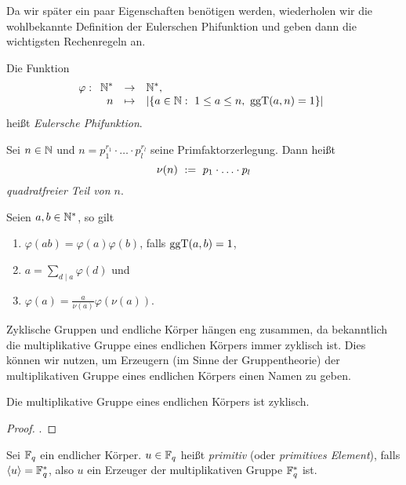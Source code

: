 Da wir später ein paar Eigenschaften benötigen
werden, wiederholen wir die wohlbekannte Definition der Eulerschen
Phifunktion und geben dann die wichtigsten Rechenregeln an.

\begin{definition}
  \label{def:euler_phi}
  Die Funktion
  \[ \varphi: \funcdef{\N^\ast &\to& \N^\ast,\\
    n &\mapsto& |\{ a \in \N:\ 1\leq a\leq n,\ \ggT(a,n)=1 \}|}\]
  heißt \emph{Eulersche Phifunktion}.
\end{definition}

\begin{definition}
  \label{def:quadratfreier_teil}
  Sei $n \in \mathbb{N}$ und $n = p_1^{r_1}\cdot\ldots\cdot p_l^{r_l}$ seine
  Primfaktorzerlegung. Dann heißt
  \[ \nu(n) \ :=\  p_1\cdot \ldots\cdot p_l\]
  \emph{quadratfreier Teil von $n$}.
\end{definition}


\begin{lemma}
  \label{lemma:rechenregeln_phifunktion}
  Seien $a,b\in\mathbb{N}^\ast$, so gilt
  \begin{enumerate}
    \item $\varphi(ab) = \varphi(a)\varphi(b)$, falls $\operatorname{ggT}(a,b) = 1$,
    \item $a = \sum_{d\mid a} \varphi(d)$ und
    \item $\varphi(a) = \tfrac{a}{\nu(a)}\varphi(\nu(a))$.
  \end{enumerate}
\end{lemma}


Zyklische Gruppen und endliche Körper hängen eng zusammen, da bekanntlich die
multiplikative Gruppe eines endlichen Körpers immer zyklisch ist. Dies können
wir nutzen, um Erzeugern (im Sinne der Gruppentheorie) der multiplikativen
Gruppe eines endlichen Körpers einen Namen zu geben.

\begin{satz}
  \label{satz:mult_gruppe_endl_korper_zyklisch}
  Die multiplikative Gruppe eines endlichen Körpers ist zyklisch.
\end{satz}
\begin{proof}
  \autocite[Theorem 2.8]{lidl1997finite}.
\end{proof}


\begin{definition}[primitiv]
  \label{def:primitiv}
  Sei $\mathbb{F}_q$ ein endlicher Körper. $u\in \mathbb{F}_q$ heißt \emph{primitiv} 
  (oder \emph{primitives Element}), falls $\langle u \rangle = \mathbb{F}_q^\ast$, 
  also $u$ ein Erzeuger der multiplikativen Gruppe $\mathbb{F}_q^\ast$ ist.
\end{definition}


